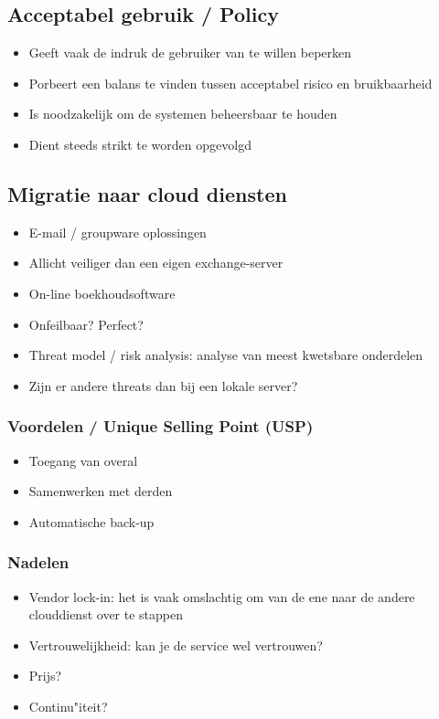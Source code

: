 \documentclass{article}
\begin{document}
\subsection{Acceptabel gebruik / Policy}

\begin{itemize}
    \item Geeft vaak de indruk de gebruiker van te willen beperken
    \item Porbeert een balans te vinden tussen acceptabel risico en bruikbaarheid
    \item Is noodzakelijk om de systemen beheersbaar te houden
    \item Dient steeds strikt te worden opgevolgd
\end{itemize}

\subsection{Migratie naar cloud diensten}

\begin{itemize}
    \item E-mail / groupware oplossingen
    \item Allicht veiliger dan een eigen exchange-server
    \item On-line boekhoudsoftware
    \item Onfeilbaar? Perfect? 
    \item Threat model / risk analysis: analyse van meest kwetsbare onderdelen
    \item Zijn er andere threats dan bij een lokale server?
\end{itemize}

\subsubsection{Voordelen / Unique Selling Point (USP)}

\begin{itemize}
    \item Toegang van overal
    \item Samenwerken met derden
    \item Automatische back-up
\end{itemize}

\subsubsection{Nadelen}

\begin{itemize}
    \item Vendor lock-in: het is vaak omslachtig om van de ene naar de andere clouddienst over te stappen
    \item Vertrouwelijkheid: kan je de service wel vertrouwen?
    \item Prijs?
    \item Continu"iteit?
\end{itemize}
\end{document}
